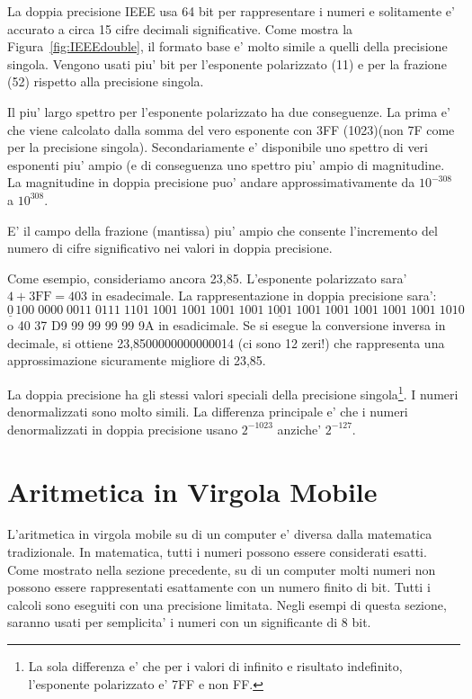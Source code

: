 La doppia precisione IEEE usa 64 bit per rappresentare i numeri e
solitamente e' accurato a circa 15 cifre decimali significative. Come
mostra la Figura~\ref{fig:IEEEdouble}, il formato base e' molto simile
a quelli della precisione singola. Vengono usati piu' bit per
l'esponente polarizzato (11) e per la frazione (52) rispetto alla
precisione singola. 

Il piu' largo spettro per l'esponente polarizzato ha due conseguenze. La
prima e' che viene calcolato dalla somma del vero esponente con 3FF
(1023)(non 7F come per la precisione singola). Secondariamente e' 
disponibile uno spettro di veri esponenti piu' ampio (e di conseguenza
uno spettro piu' ampio di magnitudine. La magnitudine in doppia precisione
puo' andare approssimativamente da $10^{-308}$ a $10^{308}$.

E' il campo della frazione (mantissa) piu' ampio che consente l'incremento
del numero di cifre significativo nei valori in doppia precisione. 

Come esempio, consideriamo ancora 23,85. L'esponente polarizzato sara'
$4 + \mathrm{3FF} = 403$ in esadecimale. La rappresentazione in doppia
precisione sara':
\[ \underline{0}\,100\;0000\;0011\;\underline{0111\;1101\;1001\;1001\;1001\;
   1001\;1001\;1001\;1001\;1001\;1001\;1001\;1010} \]
o 40 37 D9 99 99 99 99 9A in esadicimale. Se si esegue la conversione
inversa in decimale, si ottiene 23,8500000000000014 (ci sono 12 zeri!)
che rappresenta una approssimazione sicuramente migliore di 23,85.

La doppia precisione ha gli stessi valori speciali della precisione
singola\footnote{La sola differenza e' che per i valori di infinito 
e risultato indefinito, l'esponente polarizzato e' 7FF e non FF.}.
I numeri denormalizzati sono molto simili. La differenza principale
e' che i numeri denormalizzati in doppia precisione usano $2^{-1023}$
anziche' $2^{-127}$.

\section{Aritmetica in Virgola Mobile}

L'aritmetica in virgola mobile su di un computer e' diversa dalla
matematica tradizionale. In matematica, tutti i numeri possono essere
considerati esatti. Come mostrato nella sezione precedente, su di un
computer molti numeri non possono essere rappresentati esattamente
con un numero finito di bit. Tutti i calcoli sono eseguiti con una
precisione limitata. Negli esempi di questa sezione, saranno usati
per semplicita' i numeri con un significante di 8 bit.

